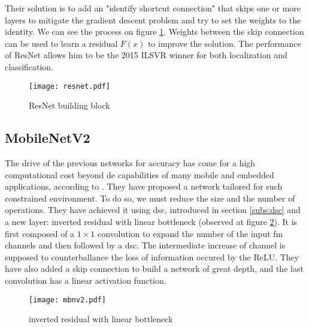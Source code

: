 Their solution is to add an "identify shortcut connection" that skips one or more layers to mitigate the gradient descent problem and try to set the weights to the identity. We can see the process on figure \ref{fig:resnet}. Weights between the skip connection can be used to learn a residual $F(x)$ to improve the solution. The performance of ResNet allows him to be the 2015 ILSVR winner for both localization and classiﬁcation.
%
\begin{figure}
    \centering
    \texttt{[image: resnet.pdf]}
    \caption{ResNet building block \cite{he_deep_2015}}
    \label{fig:resnet}
\end{figure}
%
\subsection{MobileNetV2}
The drive of the previous networks for accuracy has come for a high computational cost beyond de capabilities of many mobile and embedded applications, according to \textcite{sandler_mobilenetv2_2019}. They have proposed a network tailored for such constrained environment. To do so, we must reduce the size and the number of operations. They have achieved it using \acrshort{dsc}, introduced in section \ref{subs:dsc} and a new layer: inverted residual with linear bottleneck (observed at figure \ref{fig:invreslinbot}). It is first composed of a $1 \times 1$ convolution to expand the number of the input \acrshort{fm} channels and then followed by a \acrshort{dsc}. The intermediate increase of channel is supposed to counterballance the loss of information occured by the ReLU. They have also added a skip connection to build a network of great depth, and the last convolution has a linear activation function.
%
\begin{figure}
    \centering
    \texttt{[image: mbnv2.pdf]}
    \caption{inverted residual with linear bottleneck \cite{sandler_mobilenetv2_2019}}
    \label{fig:invreslinbot}
\end{figure}
